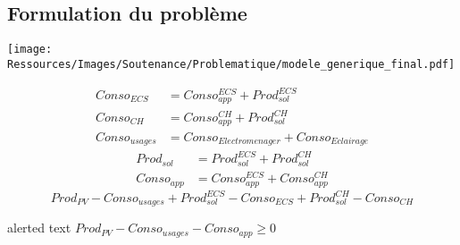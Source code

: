 \documentclass[xcolor=x11names, compress, 11pt]{beamer}
\newcommand{\addalert}[1]{%
\begin{beamercolorbox}[sep=2pt,center,shadow=true,rounded=true]{alerted text}
    #1\par%
\end{beamercolorbox}%
}
\begin{document}
\subsection{Formulation du problème}
\begin{frame}[c]
    \vfill
    \texttt{[image: Ressources/Images/Soutenance/Problematique/modele\_generique\_final.pdf]}
    \vfill
\end{frame}


\begin{frame}[t]
    \small
    \raggedright
    \vfill
    \begin{subequations}
        \begin{align*}
            Conso_{ECS} &= Conso^{ECS}_{app} +  Prod^{ECS}_{sol} \\
            Conso_{CH} &= Conso^{CH}_{app} +  Prod^{CH}_{sol} \\
            Conso_{usages} &= Conso_{Electromenager} + Conso_{Eclairage}
        \end{align*}
    \end{subequations}
    \vfill
    \begin{subequations}
        \begin{align*}
            Prod_{sol} &= Prod^{ECS}_{sol} + Prod^{CH}_{sol} \\
            Conso_{app} &= Conso^{ECS}_{app} + Conso^{CH}_{app}
        \end{align*}
    \end{subequations}
    \vfill
    \begin{equation*}
        Prod_{PV} - Conso_{usages} + Prod^{ECS}_{sol} - Conso_{ECS} + Prod^{CH}_{sol} - Conso_{CH}
    \end{equation*}
    \vfill
    \addalert{$Prod_{PV} - Conso_{usages} - Conso_{app} \geq 0$}
\end{frame}
\end{document}
